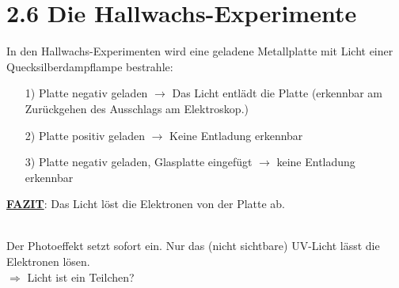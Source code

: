 \documentclass[12pt,a4paper]{report}
\begin{document}
	\section*{2.6 Die Hallwachs-Experimente}
	In den Hallwachs-Experimenten wird eine geladene Metallplatte mit Licht einer Quecksilberdampflampe bestrahle:
	\begin{itemize}
		\item[1)] Platte negativ geladen $\to$ Das Licht entlädt die Platte (erkennbar am Zurückgehen des Ausschlags am Elektroskop.)
		\item[2)] Platte positiv geladen $\to$ Keine Entladung erkennbar
		\item[3)] Platte negativ geladen, Glasplatte eingefügt $\to$ keine Entladung erkennbar
	\end{itemize}
	\underline{\textbf{FAZIT}}: Das Licht löst die Elektronen von der Platte ab. \\[1cm]
	\\
	Der Photoeffekt setzt sofort ein. Nur das (nicht sichtbare) UV-Licht lässt die Elektronen lösen.
	\\
	$\Rightarrow$ Licht ist ein Teilchen?
\end{document}
